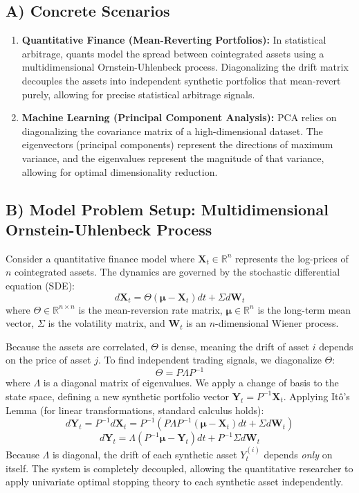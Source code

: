 \documentclass[11pt, a4paper]{article}
\theoremstyle{definition}
\theoremstyle{remark}
\newcommand{\R}{\mathbb{R}}
\begin{document}
\subsection{A) Concrete Scenarios}
\begin{enumerate}
    \item \textbf{Quantitative Finance (Mean-Reverting Portfolios):} In statistical arbitrage, quants model the spread between cointegrated assets using a multidimensional Ornstein-Uhlenbeck process. Diagonalizing the drift matrix decouples the assets into independent synthetic portfolios that mean-revert purely, allowing for precise statistical arbitrage signals.
    \item \textbf{Machine Learning (Principal Component Analysis):} PCA relies on diagonalizing the covariance matrix of a high-dimensional dataset. The eigenvectors (principal components) represent the directions of maximum variance, and the eigenvalues represent the magnitude of that variance, allowing for optimal dimensionality reduction.
\end{enumerate}

\subsection{B) Model Problem Setup: Multidimensional Ornstein-Uhlenbeck Process}
Consider a quantitative finance model where $\mathbf{X}_t \in \R^n$ represents the log-prices of $n$ cointegrated assets. The dynamics are governed by the stochastic differential equation (SDE):
\[
d\mathbf{X}_t = \Theta (\boldsymbol{\mu} - \mathbf{X}_t)dt + \Sigma d\mathbf{W}_t
\]
where $\Theta \in \R^{n \times n}$ is the mean-reversion rate matrix, $\boldsymbol{\mu} \in \R^n$ is the long-term mean vector, $\Sigma$ is the volatility matrix, and $\mathbf{W}_t$ is an $n$-dimensional Wiener process.

Because the assets are correlated, $\Theta$ is dense, meaning the drift of asset $i$ depends on the price of asset $j$. To find independent trading signals, we diagonalize $\Theta$:
\[
\Theta = P \Lambda P^{-1}
\]
where $\Lambda$ is a diagonal matrix of eigenvalues. We apply a change of basis to the state space, defining a new synthetic portfolio vector $\mathbf{Y}_t = P^{-1}\mathbf{X}_t$. Applying Itô's Lemma (for linear transformations, standard calculus holds):
\[
d\mathbf{Y}_t = P^{-1} d\mathbf{X}_t = P^{-1} \left( P \Lambda P^{-1} (\boldsymbol{\mu} - \mathbf{X}_t)dt + \Sigma d\mathbf{W}_t \right)
\]
\[
d\mathbf{Y}_t = \Lambda (P^{-1}\boldsymbol{\mu} - \mathbf{Y}_t)dt + P^{-1}\Sigma d\mathbf{W}_t
\]
Because $\Lambda$ is diagonal, the drift of each synthetic asset $Y^{(i)}_t$ depends \textit{only} on itself. The system is completely decoupled, allowing the quantitative researcher to apply univariate optimal stopping theory to each synthetic asset independently.
\end{document}
